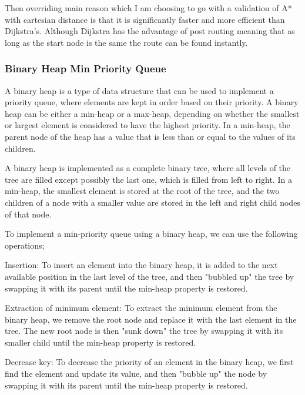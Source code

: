 \begin{FlushLeft}
    Then overriding main reason which I am choosing to go with a validation of A* with cartesian distance is that it is significantly faster and more efficient than Dijkstra's. Although Dijkstra has the advantage of post routing meaning that as long as the start node is the same the route can be found instantly. 
    \bk

    \subsubsection{Binary Heap Min Priority Queue}
    A binary heap is a type of data structure that can be used to implement a priority queue, where elements are kept in order based on their priority. A binary heap can be either a min-heap or a max-heap, depending on whether the smallest or largest element is considered to have the highest priority. In a min-heap, the parent node of the heap has a value that is less than or equal to the values of its children.\\ \bk

    A binary heap is implemented as a complete binary tree, where all levels of the tree are filled except possibly the last one, which is filled from left to right. In a min-heap, the smallest element is stored at the root of the tree, and the two children of a node with a smaller value are stored in the left and right child nodes of that node.\\ \bk
    
    To implement a min-priority queue using a binary heap, we can use the following operations;\\ \bk

    Insertion: To insert an element into the binary heap, it is added to the next available position in the last level of the tree, and then "bubbled up" the tree by swapping it with its parent until the min-heap property is restored.\\ \bk
    
    Extraction of minimum element: To extract the minimum element from the binary heap, we remove the root node and replace it with the last element in the tree. The new root node is then "sunk down" the tree by swapping it with its smaller child until the min-heap property is restored.\\ \bk
    
    Decrease key: To decrease the priority of an element in the binary heap, we first find the element and update its value, and then "bubble up" the node by swapping it with its parent until the min-heap property is restored.\\ \bk
    

\end{FlushLeft}
